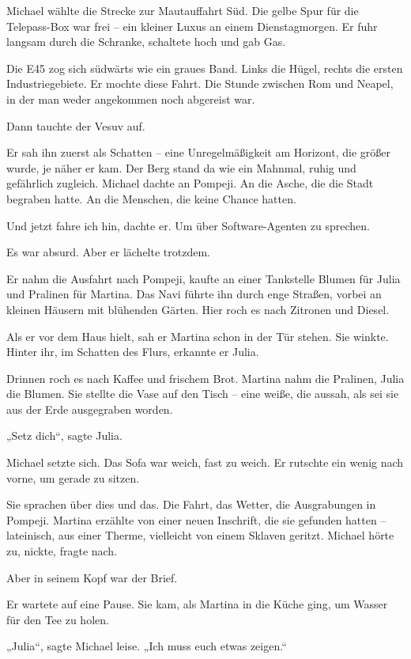 \documentclass[
]{article}
\begin{document}
Michael wählte die Strecke zur Mautauffahrt Süd. Die gelbe Spur für die Telepass-Box war frei -- ein kleiner Luxus an einem Dienstagmorgen. Er fuhr langsam durch die Schranke, schaltete hoch und gab Gas.

Die E45 zog sich südwärts wie ein graues Band. Links die Hügel, rechts die ersten Industriegebiete. Er mochte diese Fahrt. Die Stunde zwischen Rom und Neapel, in der man weder angekommen noch abgereist war.

Dann tauchte der Vesuv auf.

Er sah ihn zuerst als Schatten -- eine Unregelmäßigkeit am Horizont, die größer wurde, je näher er kam. Der Berg stand da wie ein Mahnmal, ruhig und gefährlich zugleich. Michael dachte an Pompeji. An die Asche, die die Stadt begraben hatte. An die Menschen, die keine Chance hatten.

Und jetzt fahre ich hin, dachte er. Um über Software-Agenten zu sprechen.

Es war absurd. Aber er lächelte trotzdem.

Er nahm die Ausfahrt nach Pompeji, kaufte an einer Tankstelle Blumen für Julia und Pralinen für Martina. Das Navi führte ihn durch enge Straßen, vorbei an kleinen Häusern mit blühenden Gärten. Hier roch es nach Zitronen und Diesel.

Als er vor dem Haus hielt, sah er Martina schon in der Tür stehen. Sie winkte. Hinter ihr, im Schatten des Flurs, erkannte er Julia.

Drinnen roch es nach Kaffee und frischem Brot. Martina nahm die Pralinen, Julia die Blumen. Sie stellte die Vase auf den Tisch -- eine weiße, die aussah, als sei sie aus der Erde ausgegraben worden.

„Setz dich``, sagte Julia.

Michael setzte sich. Das Sofa war weich, fast zu weich. Er rutschte ein wenig nach vorne, um gerade zu sitzen.

Sie sprachen über dies und das. Die Fahrt, das Wetter, die Ausgrabungen in Pompeji. Martina erzählte von einer neuen Inschrift, die sie gefunden hatten -- lateinisch, aus einer Therme, vielleicht von einem Sklaven geritzt. Michael hörte zu, nickte, fragte nach.

Aber in seinem Kopf war der Brief.

Er wartete auf eine Pause. Sie kam, als Martina in die Küche ging, um Wasser für den Tee zu holen.

„Julia``, sagte Michael leise. „Ich muss euch etwas zeigen.``
\end{document}
